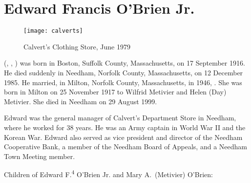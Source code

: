 \section{Edward Francis O'Brien Jr.}\label{per:Edward4OBrien3}

\begin{figure}[htbp]
	\centering
	\texttt{[image: calverts]}
	\caption{Calvert's Clothing Store, June 1979}
	\label{fig:Calverts}
\end{figure}

 (, , ) was born in Boston, Suffolk County, Massachusetts, on 17 September 1916.\cite{Edward4OBrien3Birth} He died suddenly in Needham, Norfolk County, Massachusetts, on 12 December 1985.\cite{Edward4OBrien3Death,Edward4OBrien3Obit:1} He married, in Milton, Norfolk County, Massachusetts, in 1946, .\cite{Edward4OBrien3Marriage} She was born in Milton on 25 November 1917 to Wilfrid Metivier and Helen (Day) Metivier.\cite{MaryMetivierBirth} She died in Needham on 29 August 1999.\cite{MaryMetivierDeath}

Edward was the general manager of Calvert's Department Store in Needham, where he worked for 38 years. He was an Army captain in World War II and the Korean War. Edward also served as vice president and director of the Needham Cooperative Bank, a member of the Needham Board of Appeals, and a Needham Town Meeting member.\cite{Edward4OBrien3Obit:2}

\begin{KidsIntro}
	Children of Edward F.\textsuperscript{4} O'Brien Jr. and Mary A.\ (Metivier) O'Brien:
\end{KidsIntro}

\begin{Kids}
	\KidNum{}{$\bullet$}
	
	\KidNum{}{$\bullet$}
	
	\KidNum{}{$\bullet$}
	
	\KidNum{}{$\bullet$}
\end{Kids}
